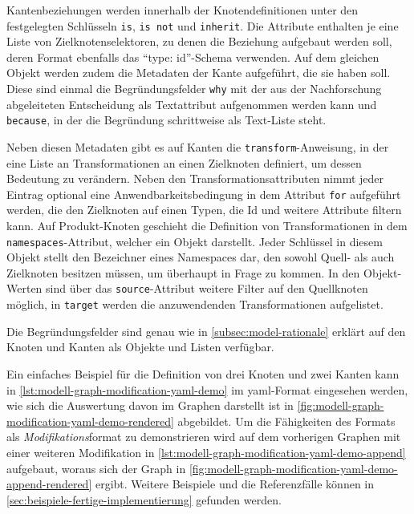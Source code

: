 Kantenbeziehungen werden innerhalb der Knotendefinitionen unter den festgelegten Schlüsseln \texttt{is}, \texttt{is not} und \texttt{inherit}.
Die Attribute enthalten je eine Liste von Zielknotenselektoren, zu denen die Beziehung aufgebaut werden soll, deren Format ebenfalls das \enquote{type: id}-Schema verwenden.
Auf dem gleichen Objekt werden zudem die Metadaten der Kante aufgeführt, die sie haben soll.
Diese sind einmal die Begründungsfelder \texttt{why} mit der aus der Nachforschung abgeleiteten Entscheidung als Textattribut aufgenommen werden kann und \texttt{because}, in der die Begründung schrittweise als Text-Liste steht.

Neben diesen Metadaten gibt es auf Kanten die \texttt{transform}-Anweisung, in der eine Liste an Transformationen an einen Zielknoten definiert, um dessen Bedeutung zu verändern.
Neben den Transformationsattributen nimmt jeder Eintrag optional eine Anwendbarkeitsbedingung in dem Attribut \texttt{for} aufgeführt werden, die den Zielknoten auf einen Typen, die Id und weitere Attribute filtern kann.
Auf Produkt-Knoten geschieht die Definition von Transformationen in dem \texttt{namespaces}-Attribut, welcher ein Objekt darstellt.
Jeder Schlüssel in diesem Objekt stellt den Bezeichner eines Namespaces dar, den sowohl Quell- als auch Zielknoten besitzen müssen, um überhaupt in Frage zu kommen.
In den Objekt-Werten sind über das \texttt{source}-Attribut weitere Filter auf den Quellknoten möglich, in \texttt{target} werden die anzuwendenden Transformationen aufgelistet.

Die Begründungsfelder sind genau wie in \autoref{subsec:model-rationale} erklärt auf den Knoten und Kanten als Objekte und Listen verfügbar.

Ein einfaches Beispiel für die Definition von drei Knoten und zwei Kanten kann in \autoref{lst:modell-graph-modification-yaml-demo} im \acrshort{yaml}-Format eingesehen werden, wie sich die Auswertung davon im Graphen darstellt ist in \autoref{fig:modell-graph-modification-yaml-demo-rendered} abgebildet.
Um die Fähigkeiten des Formats als \textit{Modifikations}format zu demonstrieren wird auf dem vorherigen Graphen mit einer weiteren Modifikation in \autoref{lst:modell-graph-modification-yaml-demo-append} aufgebaut, woraus sich der Graph in \autoref{fig:modell-graph-modification-yaml-demo-append-rendered} ergibt.
Weitere Beispiele und die Referenzfälle können in \autoref{sec:beispiele-fertige-implementierung} gefunden werden.

